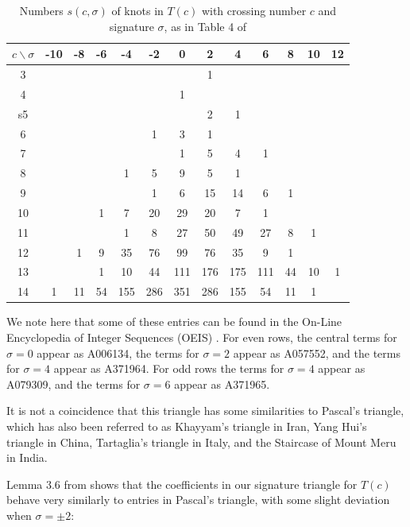 \documentclass[11pt]{amsart}
\theoremstyle{definition}
\theoremstyle{remark}
\numberwithin{equation}{section}
\begin{document}
\begin{table}[h!]
\begin{tabular}{c|cccc|c|c|c|ccccc}
$c\backslash\sigma$ & -10 & -8 & -6 & -4 & -2 & 0 & 2 & 4 & 6 & 8 & 10 & 12 \\
\hline
3 &   &   &   &  &  &  & 1 &  &  &  &  &  \\
4 &   &   &   &  &  & 1 &  &  &  &  &  &  \\
s5 &   &   &   &  &  &  & 2 & 1 &  &  &  &  \\
6 &  &  &  &   & 1 & 3 & 1 &  &  &  &  &  \\
7 &  &  &  &  &  & 1 & 5 & 4 & 1 &  &  &  \\
8 &  &  &  & 1 & 5 & 9 & 5 & 1 &  &  &  &  \\
9 &  &  &  &  & 1 & 6 & 15 & 14 & 6 & 1 &  &  \\
10 &  &  & 1 & 7 & 20 & 29 & 20 & 7 & 1 &  &  &  \\
11 &  &  &  & 1 & 8 & 27 & 50 & 49 & 27 & 8 & 1 &  \\
12 &  & 1 & 9 & 35 & 76 & 99 & 76 & 35 & 9 & 1 &  &  \\
13 &  &  & 1 & 10 & 44 & 111 & 176 & 175 & 111 & 44 & 10 & 1 \\
14 & 1 & 11 & 54 & 155 & 286 & 351 & 286 & 155 & 54 & 11 & 1 & 
\end{tabular}
\caption{Numbers $s(c,\sigma)$ of knots in $T(c)$ with crossing number $c$ and signature $\sigma$, as in Table 4 of \cite{CLMR}}
\label{tab:sig}
\end{table}

We note here that some of these entries can be found in the On-Line Encyclopedia of Integer Sequences (OEIS) \cite{OEIS}.  For even rows, the central terms for $\sigma=0$ appear as A006134, the terms for $\sigma=2$ appear as A057552, and the terms for $\sigma=4$ appear as A371964.  
For odd rows the terms for $\sigma=4$ appear as A079309, and the terms for $\sigma=6$ appear as  A371965.

It is not a coincidence that this triangle has some similarities to Pascal's triangle, which has also been referred to as  Khayyam's triangle in Iran,  Yang Hui's triangle in China, Tartaglia's triangle in Italy, and the Staircase of Mount Meru in India.



Lemma 3.6 from \cite{CLMR} shows that the coefficients in our signature triangle for $T(c)$ behave very similarly to entries in Pascal's triangle, with some slight deviation when $\sigma=\pm 2$:
\end{document}

